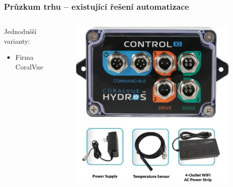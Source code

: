 \documentclass[%
  12pt,       				%
	t,                  %
	aspectratio=1610,   %
	unicode,						%
]{beamer}				    	%
\begin{document}
\begin{frame}[fragile]
	\frametitle{Průzkum trhu -- existující řešení automatizace}
	
	\begin{columns}[T] 								%
		\begin{column}{0.5\textwidth}		%
			Jednodušší varianty:\\[1ex]
			\begin{itemize}
				\item Firma CoralVue
			\end{itemize}

			
		\end{column}
		\begin{column}{0.5\textwidth}		%
			\begin{figure}%
				\centering
				\vspace{-0.5cm}	              %
				\includegraphics[width=\columnwidth]{obrazky/prezentace/hydros-x2-starter-pack.jpg}
			\end{figure}
		\end{column}
	\end{columns}											%
\end{frame}
\end{document}
